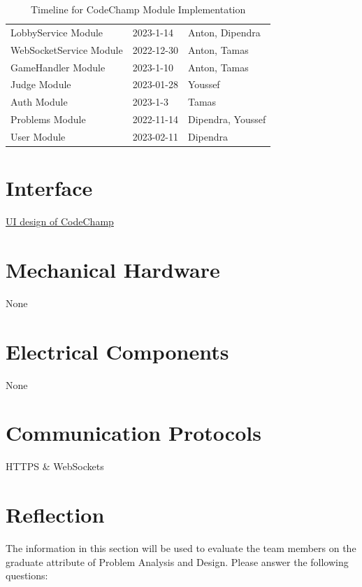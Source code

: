 \documentclass[12pt, titlepage]{article}
\begin{document}
\begin{table}[H]
\begin{tabular}{p{} p{}  p{}}
LobbyService Module & 2023-1-14 & Anton, Dipendra\\
WebSocketService Module & 2022-12-30 & Anton, Tamas \\
GameHandler Module & 2023-1-10 & Anton, Tamas\\
Judge Module & 2023-01-28 & Youssef\\
Auth Module & 2023-1-3 & Tamas\\
Problems Module & 2022-11-14 & Dipendra, Youssef\\
User Module & 2023-02-11 & Dipendra 
\end{tabular}
\caption{Timeline for CodeChamp Module Implementation}
\label{TblMH}
\end{table}

\newpage{}

\appendix

\section{Interface}

\href{https://www.figma.com/file/finLDRJKaEoH8IDQkzlI3X/CodeChamp?node-id=507%
}{UI design of CodeChamp}


\section{Mechanical Hardware}

None

\section{Electrical Components}

None

\section{Communication Protocols}
HTTPS \& WebSockets

\section{Reflection}

The information in this section will be used to evaluate the team members on the
graduate attribute of Problem Analysis and Design.  Please answer the following questions:
\end{document}
